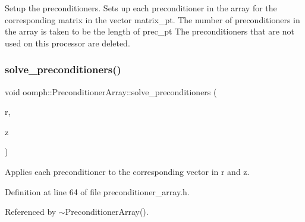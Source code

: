 Setup the preconditioners. Sets up each preconditioner in the array for the corresponding matrix in the vector matrix\+\_\+pt. The number of preconditioners in the array is taken to be the length of prec\+\_\+pt The preconditioners that are not used on this processor are deleted. 

\mbox{\label{classoomph_1_1PreconditionerArray_a11a8bc01a8addffd5212369a2dc72ef7}} 
\subsubsection{\texorpdfstring{solve\+\_\+preconditioners()}{solve\_preconditioners()}\hspace{0.1cm}{\footnotesize\ttfamily [1/2]}}
{\footnotesize\ttfamily void oomph\+::\+Preconditioner\+Array\+::solve\+\_\+preconditioners (\begin{DoxyParamCaption}\item[{const \hyperlink{classoomph_1_1Vector}{Vector}$<$ \hyperlink{classoomph_1_1DoubleVector}{Double\+Vector} $>$ \&}]{r,  }\item[{\hyperlink{classoomph_1_1Vector}{Vector}$<$ \hyperlink{classoomph_1_1DoubleVector}{Double\+Vector} $>$ \&}]{z }\end{DoxyParamCaption})\hspace{0.3cm}{\ttfamily [inline]}}



Applies each preconditioner to the corresponding vector in r and z. 



Definition at line 64 of file preconditioner\+\_\+array.\+h.



Referenced by $\sim$\+Preconditioner\+Array().

\mbox{\label{classoomph_1_1PreconditionerArray_a11a8bc01a8addffd5212369a2dc72ef7}} 
